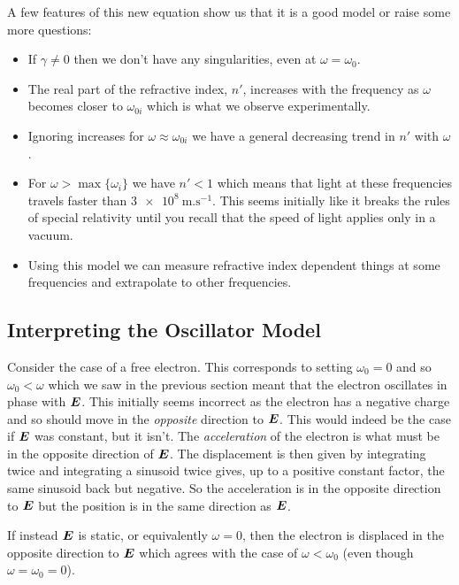     A few features of this new equation show us that it is a good model or raise some more questions:
    \begin{itemize}
        \item If \(\gamma \ne 0\) then we don't have any singularities, even at \(\omega = \omega_0\).
        
        \item The real part of the refractive index, \(n'\), increases with the frequency as \(\omega\) becomes closer to \(\omega_{0i}\) which is what we observe experimentally.
        
        \item Ignoring increases for \(\omega \approx \omega_{0i}\) we have a general decreasing trend in \(n'\) with \(\omega\).
        
        \item For \(\omega > \max\{\omega_i\}\) we have \(n' < 1\) which means that light at these frequencies travels faster than \(\SI{3e8}{\metre.\second^{-1}}\).
        This seems initially like it breaks the rules of special relativity until you recall that the speed of light applies only in a vacuum.
        
        \item Using this model we can measure refractive index dependent things at some frequencies and extrapolate to other frequencies.
    \end{itemize}

    \subsection{Interpreting the Oscillator Model}
    Consider the case of a free electron.
    This corresponds to setting \(\omega_0 = 0\) and so \(\omega_0 < \omega\) which we saw in the previous section meant that the electron oscillates in phase with \(\bm{E}\).
    This initially seems incorrect as the electron has a negative charge and so should move in the \emph{opposite} direction to \(\bm{E}\).
    This would indeed be the case if \(\bm{E}\) was constant, but it isn't.
    The \emph{acceleration} of the electron is what must be in the opposite direction of \(\bm{E}\).
    The displacement is then given by integrating twice and integrating a sinusoid twice gives, up to a positive constant factor, the same sinusoid back but negative.
    So the acceleration is in the opposite direction to \(\bm{E}\) but the position is in the same direction as \(\bm{E}\).
    
    If instead \(\bm{E}\) is static, or equivalently \(\omega = 0\), then the electron is displaced in the opposite direction to \(\bm{E}\) which agrees with the case of \(\omega < \omega_0\) (even though \(\omega = \omega_0 = 0\)).
    
